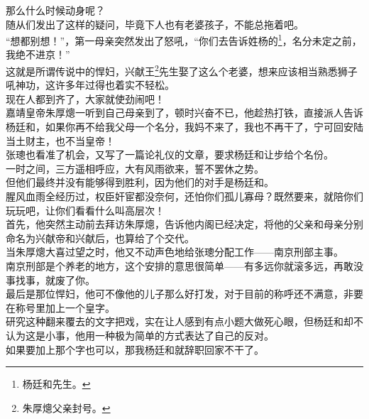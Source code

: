 \begin{multicols}{\theparacolNo}
那么什么时候动身呢？\\

随从们发出了这样的疑问，毕竟下人也有老婆孩子，不能总拖着吧。\\

“想都别想！”，第一母亲突然发出了怒吼，“你们去告诉姓杨的\footnote{杨廷和先生。}，名分未定之前，我绝不进京！”\\

这就是所谓传说中的悍妇，兴献王\footnote{朱厚熜父亲封号。}先生娶了这么个老婆，想来应该相当熟悉狮子吼神功，这许多年过得也着实不轻松。\\

现在人都到齐了，大家就使劲闹吧！\\

嘉靖皇帝朱厚熜一听到自己母亲到了，顿时兴奋不已，他趁热打铁，直接派人告诉杨廷和，如果你再不给我父母一个名分，我妈不来了，我也不再干了，宁可回安陆当土财主，也不当皇帝！\\

张璁也看准了机会，又写了一篇论礼仪的文章，要求杨廷和让步给个名份。\\

一时之间，三方遥相呼应，大有风雨欲来，誓不罢休之势。\\

但他们最终并没有能够得到胜利，因为他们的对手是杨廷和。\\

腥风血雨全经历过，权臣奸宦都没奈何，还怕你们孤儿寡母？既然要来，就陪你们玩玩吧，让你们看看什么叫高层次！\\

首先，他突然主动前去拜访朱厚熜，告诉他内阁已经决定，将他的父亲和母亲分别命名为兴献帝和兴献后，也算给了个交代。\\

当朱厚熜大喜过望之时，他又不动声色地给张璁分配工作——南京刑部主事。\\

南京刑部是个养老的地方，这个安排的意思很简单——有多远你就滚多远，再敢没事找事，就废了你。\\

最后是那位悍妇，他可不像他的儿子那么好打发，对于目前的称呼还不满意，非要在称号里加上一个皇字。\\

研究这种翻来覆去的文字把戏，实在让人感到有点小题大做死心眼，但杨廷和却不认为这是小事，他用一种极为简单的方式表达了自己的反对。\\

如果要加上那个字也可以，那我杨廷和就辞职回家不干了。\\


\end{multicols}
